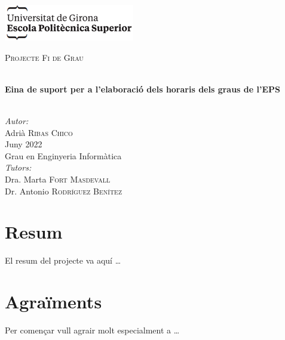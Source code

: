 \documentclass[a4paper,12pt]{ThesisStyle}
\begin{document}
\begin{titlepage}

\includegraphics[scale=0.9]{imatges/logo_eps.png} \\[1cm]
\begin{center}
\textsc{\Large Projecte Fi de Grau} \\[1cm]

\begin{spacing}{2}
\HRule \\
\textbf{\Huge Eina de suport per a l’elaboració dels horaris dels graus de l’EPS} \\
\HRule \\[0.5cm]
\end{spacing}

{
\large
\emph{Autor:} \\
Adrià \textsc{Ribas Chico} \\[1cm]
Juny 2022 \\[1cm]
Grau en Enginyeria Informàtica \\[1cm]
\emph{Tutors:} \\
Dra. Marta \textsc{Fort Masdevall} \\
Dr. Antonio \textsc{Rodríguez Benítez} \\
}

\end{center}
\end{titlepage}

\titlepage

\dominitoc


\chapter*{Resum}
\label{cap:resum}

El resum del projecte va aquí \ldots

\chapter*{Agraïments}
\label{cap:agraiments}

Per començar vull agrair molt especialment a \ldots


\tableofcontents
\end{document}
